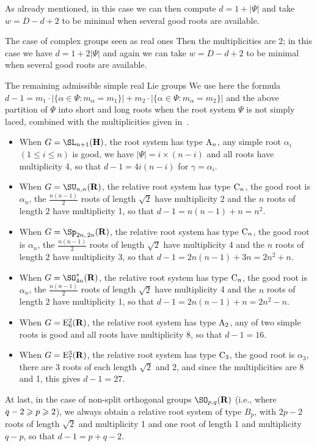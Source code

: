 As already mentioned, in this case we can then compute $d=1+|\Psi|$ and take $w=D-d+2$ to be minimal when several good roots are available.

\begin{step}{The case of complex groups seen as real ones}
Then the multiplicities are 2; in this case we have $d=1+2|\Psi|$ and again we can take $w=D-d+2$ to be minimal when several good roots are available.
\end{step}
\begin{step}{The remaining admissible simple real Lie groups}
We use here the formula $d-1 = m_1 \cdot | \{\alpha \in \Psi : m_\alpha = m_1 \}| + m_2 \cdot | \{\alpha \in \Psi : m_\alpha = m_2 \}|$ and the above partition of $\Psi$ into short and long roots when the root system $\Psi$ is not simply laced, combined with the multiplicities given in~\cite[Table~VI, pp.~532--534]{Helgason}.
\begin{itemize}
\item When $G = {\SL}_{n+1}({\bf H})$, the root system has type ${\rm A}_n$, any simple root $\alpha_i$ $(1 \leqslant i \leqslant n)$ is good, we have $|\Psi| = i \times (n-i)$ and all roots have multiplicity 4, so that $d-1 = 4i(n-i)$ for $\gamma=\alpha_i$.
\item When $G = {\SU}_{n,n}({\bf R})$, the relative root system has type ${\rm C}_n$, the good root is $\alpha_n$, the $\frac{n(n-1)}{2}$ roots of length $\sqrt{2}$ have multiplicity 2 and the $n$ roots of length $2$ have multiplicity 1, so that $d-1 = n(n-1)+n=n^2$.
\item When $G = {\Sp}_{2n,\,2n}({\bf R})$, the relative root system has type ${\rm C}_n$, the good root is $\alpha_n$, the $\frac{n(n-1)}{2}$ roots of length $\sqrt{2}$ have multiplicity 4 and the $n$ roots of length $2$ have multiplicity 3, so that $d-1 = 2n(n-1)+3n = 2n^2+n$.
\item When $G = {\SO}^*_{4n}({\bf R})$, the relative root system has type ${\rm C}_n$, the good root is $\alpha_n$, the $\frac{n(n-1)}{2}$ roots of length $\sqrt{2}$ have multiplicity 4 and the $n$ roots of length $2$ have multiplicity 1, so that $d-1 = 2n(n-1)+n = 2n^2-n$.
\item When $G = {\rm E}_6^2({\bf R})$, the relative root system has type ${\rm A}_2$, any of two simple roots is good and all roots have multiplicity 8, so that $d-1=16$.
\item When $G = {\rm E}_7^3({\bf R})$, the relative root system has type ${\rm C}_3$, the good root is $\alpha_3$, there are 3 roots of each length $\sqrt{2}$ and $2$, and since the multiplicities are 8 and 1, this gives $d-1=27$.
\end{itemize}

At last, in the case of non-split orthogonal groups ${\SO}_{p,q}({\bf R})$ (i.e., where $q-2\linebreak\geqslant p \geqslant 2$), we always obtain a relative root system of type $B_p$, with $2p-2$ roots of length $\sqrt{2}$ and multiplicity 1 and one root of length 1 and multiplicity $q-p$, so that $d-1=p+q-2$.
\end{step}
